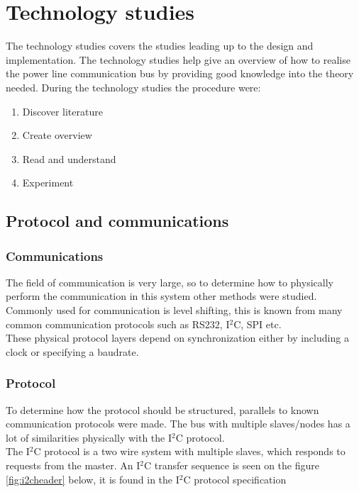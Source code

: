 \chapter{Technology studies}

The technology studies covers the studies leading up to the design and implementation. The technology studies help give an overview of how to realise the power line communication bus by providing good knowledge into the theory needed. During the technology studies the procedure were:
\begin{enumerate}
\item Discover literature
\item Create overview
\item Read and understand
\item Experiment
\end{enumerate}


\section{Protocol and communications}

\subsection{Communications}
The field of communication is very large, so to determine how to physically perform the communication in this system other methods were studied.\\
Commonly used for communication is level shifting, this is known from many common communication protocols such as RS232, I$^2$C, SPI etc.\\
These physical protocol layers depend on synchronization either by including a clock or specifying a baudrate.\\



\subsection{Protocol}
To determine how the protocol should be structured, parallels to known communication protocols were made. The bus with multiple slaves/nodes has a lot of similarities physically with the I$^2$C protocol.\\
The I$^2$C protocol is a two wire system with multiple slaves, which responds to requests from the master. An I$^2$C transfer sequence is seen on the figure \ref{fig:i2cheader} below, it is found in the I$^2$C protocol specification 


